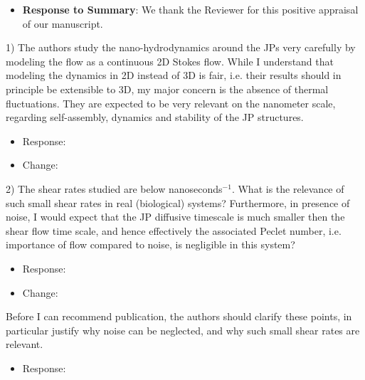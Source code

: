 \documentclass[11pt]{article}
\newcommand{\comment}[1]{{\color{blue} #1}}
\begin{document}
\begin{itemize}
  \item {\bf Response to Summary}: We thank the Reviewer for this positive appraisal of 
our manuscript. 
\end{itemize}




\noindent
\comment{1) The authors study the nano-hydrodynamics around the JPs very carefully by
modeling the flow as a continuous 2D Stokes flow. While I understand that
modeling the dynamics in 2D instead of 3D is fair, i.e. their results should in
principle be extensible to 3D, my major concern is the absence of thermal
fluctuations. They are expected to be very relevant on the nanometer scale,
regarding self-assembly, dynamics and stability of the JP structures.
}

\begin{itemize}
  \item Response:  
  
  \item Change:  
  
\end{itemize}

\noindent
\comment{2) The shear rates studied are below nanoseconds$^{-1}$. What is the relevance of
such small shear rates in real (biological) systems? Furthermore, in presence of
noise, I would expect that the JP diffusive timescale is much smaller then the
shear flow time scale, and hence effectively the associated Peclet number, i.e.
importance of flow compared to noise, is negligible in this system?}

\begin{itemize}
  \item Response:  
  
  \item Change: 
  
\end{itemize}

\noindent
\comment{Before I can recommend publication, the authors should clarify these points, in
particular justify why noise can be neglected, and why such small shear rates
are relevant.}

\begin{itemize}
  \item Response: 
\end{itemize}
\end{document}
